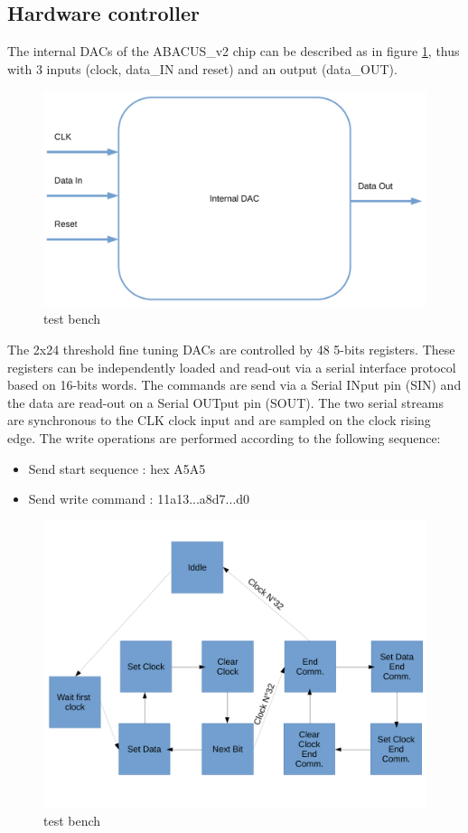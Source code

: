 \subsection{Hardware controller}\label{InternalDac}
\noindent The internal DACs of the ABACUS\_v2 chip can be described as in figure \ref{fig:internaldac}, thus with 3 inputs (clock, data\_IN and reset) and an output (data\_OUT)\cite{dac}.
\begin{figure}[H]
	\centering
	\includegraphics[width=0.4\linewidth]{IMG/ch4/INTERNALDAC}
	\caption{test bench}
	\label{fig:internaldac}
\end{figure}
\noindent The 2x24 threshold fine tuning DACs are controlled by 48 5-bits registers. These registers can be independently
loaded and read-out via a serial interface protocol based on 16-bits words. The commands are send via a Serial
INput pin (SIN) and the data are read-out on a Serial OUTput pin (SOUT). The two serial streams are
synchronous to the CLK clock input and are sampled on the clock rising edge.
The write operations are performed according to the following sequence:
\begin{itemize}
	\item Send start sequence : hex A5A5
	\item Send write command : 11a13...a8d7...d0
\end{itemize}

\begin{figure}[H]
	\centering
	\includegraphics[width=0.7\linewidth]{IMG/ch4/FSM}
	\caption{test bench}
	\label{fig:fsm}
\end{figure}

